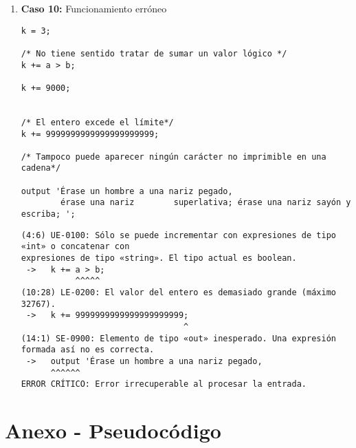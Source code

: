 \begin{enumerate}
    \item \textbf{Caso 10:} Funcionamiento erróneo
    \begin{tcolorbox}[title={Código fuente}, colback=white]
        \begin{lstlisting}
k = 3;

/* No tiene sentido tratar de sumar un valor lógico */
k += a > b;

k += 9000;


/* El entero excede el límite*/
k += 9999999999999999999999;

/* Tampoco puede aparecer ningún carácter no imprimible en una cadena*/

output 'Érase un hombre a una nariz pegado,
        érase una nariz        superlativa; érase una nariz sayón y escriba; ';
        \end{lstlisting}
    \end{tcolorbox}

    \begin{tcolorbox}[title={Errores detectados}, colback=white]
        \begin{lstlisting}
(4:6) UE-0100: Sólo se puede incrementar con expresiones de tipo «int» o concatenar con
expresiones de tipo «string». El tipo actual es boolean.
 ->   k += a > b;
           ^^^^^
(10:28) LE-0200: El valor del entero es demasiado grande (máximo 32767).
 ->   k += 9999999999999999999999;
                                 ^
(14:1) SE-0900: Elemento de tipo «out» inesperado. Una expresión formada así no es correcta.
 ->   output 'Érase un hombre a una nariz pegado,
      ^^^^^^
ERROR CRÍTICO: Error irrecuperable al procesar la entrada.
        \end{lstlisting}
    \end{tcolorbox}
\end{enumerate}

\newpage

\section{Anexo - Pseudocódigo}


